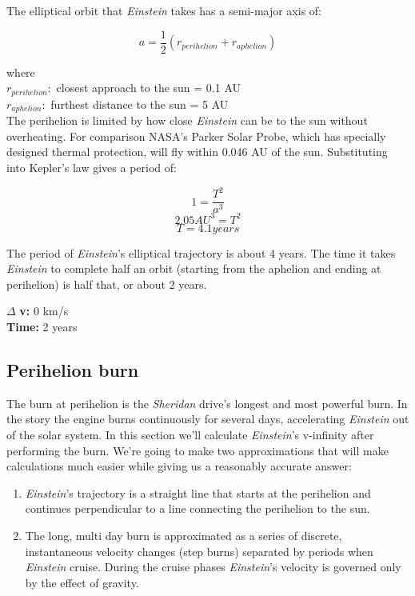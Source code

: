 \documentclass[12pt]{article} %
\begin{document}
The elliptical orbit that \textit{Einstein} takes has a semi-major axis of:

$$a = \frac{1}{2}(r_{perihelion} + r_{aphelion})$$

where\\
$r_{perihelion}:$ closest approach to the sun = 0.1 AU\\
$r_{aphelion}:$ furthest distance to the sun = 5 AU\\

The perihelion is limited by how close \textit{Einstein} can be to the sun without overheating. For comparison NASA's Parker Solar Probe, which has specially designed thermal protection, will fly within 0.046 AU of the sun. Substituting into Kepler's law gives a period of:

$$1 = \frac{T^2}{a^3}$$
$$2.05AU^{3} = T^2$$
$$T = 4.1 years$$

The period of \textit{Einstein}'s elliptical trajectory is about 4 years. The time it takes \textit{Einstein} to complete half an orbit (starting from the aphelion and ending at perihelion) is half that, or about 2 years.

$\Delta$ \textbf{v:} 0 km/s\\
\textbf{Time:} 2 years

\subsection{Perihelion burn}
The burn at perihelion is the \textit{Sheridan} drive's longest and most powerful burn. In the story the engine burns continuously for several days, accelerating \textit{Einstein} out of the solar system. In this section we'll calculate \textit{Einstein}'s v-infinity after performing the burn. We're going to make two approximations that will make calculations much easier while giving us a reasonably accurate answer:

\begin{enumerate}
\item \textit{Einstein}'s trajectory is a straight line that starts at the perihelion and continues perpendicular to a line connecting the perihelion to the sun.
\item The long, multi day burn is approximated as a series of discrete, instantaneous velocity changes (step burns) separated by periods when \textit{Einstein} cruise. During the cruise phases \textit{Einstein}'s velocity is governed only by the effect of gravity.
\end{enumerate}
\end{document}
